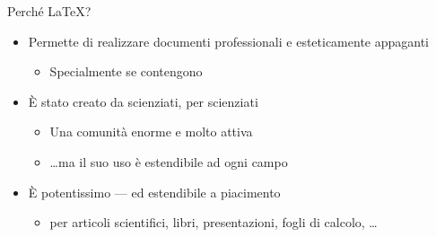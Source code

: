 \documentclass{beamer}
\begin{document}

\begin{frame}{Perch\'e \LaTeX{}?}
\begin{itemize}
\item Permette di realizzare documenti professionali e esteticamente appaganti
\begin{itemize}
\item Specialmente se contengono 
\end{itemize}
%
\item \`E stato creato da scienziati, per scienziati
\begin{itemize}
\item Una comunit\`a enorme e molto attiva
\item \ldots ma il suo uso \`e estendibile ad ogni campo
\end{itemize}
%
\item \`E potentissimo --- ed estendibile a piacimento
\begin{itemize}
\item {} per articoli scientifici, libri, presentazioni,
fogli di calcolo, \ldots
\end{itemize}
\end{itemize}
\end{frame}
\end{document}
